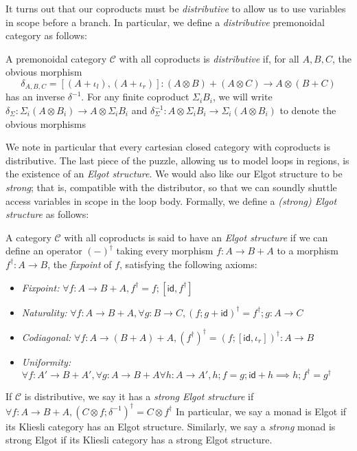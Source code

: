 \documentclass[acmsmall,screen,review]{acmart}
\newcommand{\mc}[1]{\ensuremath{\mathcal{#1}}}
\newcommand{\ms}[1]{\ensuremath{\mathsf{#1}}}
\begin{document}
It turns out that our coproducts must be \emph{distributive} to allow us to use variables in scope
before a branch. In particular, we define a \emph{distributive} premonoidal category as follows:
\begin{definition}
  A premonoidal category $\mc{C}$ with all coproducts is \emph{distributive} if, for all $A, B, C$,
  the obvious morphism
  $$
  \delta_{A, B, C} 
    = [(A + \iota_l), (A + \iota_r)] : (A \otimes B) + (A \otimes C) \to A \otimes (B + C)
  $$
  has an inverse $\delta^{-1}$. For any finite coproduct $\Sigma_iB_i$, we will write
  $\delta_{\Sigma} : \Sigma_i (A \otimes B_i) \to A \otimes \Sigma_i B_i$ and $\delta_{\Sigma}^{-1}
  : A \otimes \Sigma_i B_i \to \Sigma_i (A \otimes B_i)$ to denote the obvious morphisms
\end{definition}
We note in particular that every cartesian closed category with coproducts is distributive. The last
piece of the puzzle, allowing us to model loops in regions, is the existence of an \emph{Elgot
structure}. We would also like our Elgot structure to be \emph{strong}; that is, compatible with the
distributor, so that we can soundly shuttle access variables in scope in the loop body. Formally, we
define a \emph{(strong) Elgot structure} as follows:
\begin{definition}
  A category $\mc{C}$ with all coproducts is said to have an \emph{Elgot structure} if we can define
  an operator $(-)^\dagger$ taking every morphism $f : A \to B + A$ to a morphism $f^\dagger : A \to
  B$, the \emph{fixpoint} of $f$, satisfying the following axioms:
  \begin{itemize}
    \item \emph{Fixpoint:} $\forall f : A \to B + A, f^\dagger = f;[\ms{id}, f^\dagger]$
    \item \emph{Naturality:} $\forall f : A \to B + A, \forall g : B \to C, 
      (f;g + \ms{id})^\dagger = f^\dagger;g : A \to C$
    \item \emph{Codiagonal:} $\forall f : A \to (B + A) + A, 
      (f^\dagger)^\dagger = (f;[\ms{id}, \iota_r])^\dagger : A \to B$
    \item \emph{Uniformity:} 
    $
      \forall f : A' \to B + A', \forall g : A \to B + A \forall h : A \to A', 
        h;f = g;\ms{id} + h \implies h;f^\dagger = g^\dagger
    $
  \end{itemize}
  If $\mc{C}$ is distributive, we say it has a \emph{strong Elgot structure} if
  $
  \forall f: A \to B + A, (C \otimes f ; \delta^{-1})^\dagger = C \otimes f^\dagger
  $
  In particular, we say a monad is Elgot if its Kliesli category has an Elgot structure. Similarly,
  we say a \emph{strong} monad is strong Elgot if its Kliesli category has a strong Elgot structure.
\end{definition}
\end{document}
